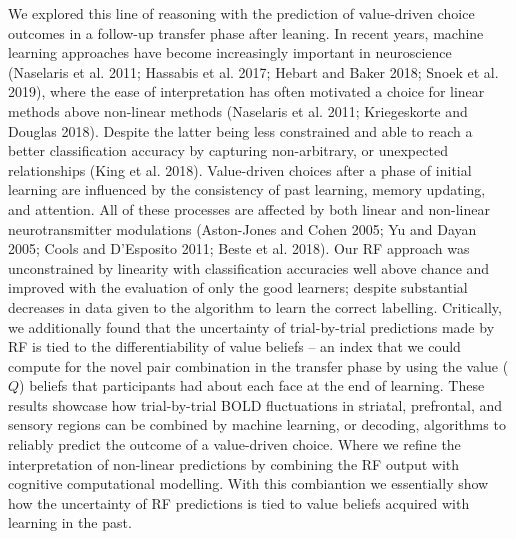 \documentclass[]{article}
\begin{document}
We explored this line of reasoning with the prediction of value-driven
choice outcomes in a follow-up transfer phase after leaning. In recent
years, machine learning approaches have become increasingly important in
neuroscience (Naselaris et al. 2011; Hassabis et al. 2017; Hebart and
Baker 2018; Snoek et al. 2019), where the ease of interpretation has
often motivated a choice for linear methods above non-linear methods
(Naselaris et al. 2011; Kriegeskorte and Douglas 2018). Despite the
latter being less constrained and able to reach a better classification
accuracy by capturing non-arbitrary, or unexpected relationships (King
et al. 2018). Value-driven choices after a phase of initial learning are
influenced by the consistency of past learning, memory updating, and
attention. All of these processes are affected by both linear and
non-linear neurotransmitter modulations (Aston-Jones and Cohen 2005; Yu
and Dayan 2005; Cools and D'Esposito 2011; Beste et al. 2018). Our RF
approach was unconstrained by linearity with classification accuracies
well above chance and improved with the evaluation of only the good
learners; despite substantial decreases in data given to the algorithm
to learn the correct labelling. Critically, we additionally found that
the uncertainty of trial-by-trial predictions made by RF is tied to the
differentiability of value beliefs -- an index that we could compute for
the novel pair combination in the transfer phase by using the value
(\(Q\)) beliefs that participants had about each face at the end of
learning. These results showcase how trial-by-trial BOLD fluctuations in
striatal, prefrontal, and sensory regions can be combined by machine
learning, or decoding, algorithms to reliably predict the outcome of a
value-driven choice. Where we refine the interpretation of non-linear
predictions by combining the RF output with cognitive computational
modelling. With this combiantion we essentially show how the uncertainty
of RF predictions is tied to value beliefs acquired with learning in the
past.
\end{document}
